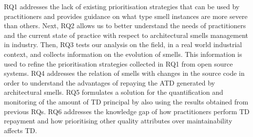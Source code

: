 RQ1 addresses the lack of existing prioritisation strategies that can be used by practitioners and provides guidance on what type smell instances are more severe than others.
Next, RQ2 allows us to better understand the needs of practitioners and the current state of practice with respect to architectural smells management in industry.
Then, RQ3 tests our analysis on the field, in a real world industrial context, and collects information on the evolution of smells. This information is used to refine the prioritisation strategies collected in RQ1 from open source systems.
RQ4 addresses the relation of smells with changes in the source code in order to understand the advantages of repaying the ATD generated by architectural smells.
RQ5 formulates a solution for the quantification and monitoring of the amount of TD principal by also using the results obtained from previous RQs.
RQ6 addresses the knowledge gap of how practitioners perform TD repayment and how prioritising other quality attributes over maintainability affects TD.


